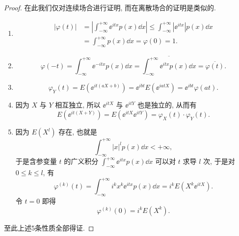 \begin{proof}
    在此我们仅对连续场合进行证明,
    而在离散场合的证明是类似的.
    \begin{enumerate}
        \item
        \begin{align*}
            \lvert \varphi (t) \rvert & = \left\lvert \int_{-\infty}^{+\infty} \ee^{itx} p (x) \dd x \right\rvert
            \leq \int_{-\infty}^{+\infty} \left\lvert \ee^{itx} \right\rvert p (x) \dd x\\
            & = \int_{-\infty}^{+\infty} p (x) \dd x
            = \varphi (0)
            = 1.
        \end{align*}
        \item
        \begin{equation*}
            \varphi (-t) = \int_{-\infty}^{+\infty} \ee^{-itx} p (x) \dd x
            = \overline{\int_{-\infty}^{+\infty} \ee^{itx} p (x) \dd x}
            = \overline{\varphi (t)}.
        \end{equation*}
        \item
        \begin{equation*}
            \varphi_Y (t) = E ( \ee^{it (aX + b)} )
            = \ee^{ibt} E ( \ee^{iatX} ) = \ee^{ibt} \varphi (at).
        \end{equation*}
        \item
        因为 $ X $ 与 $ Y $ 相互独立, 所以 $ \ee^{itX} $ 与 $ \ee^{itY} $ 也是独立的, 从而有
        \begin{equation*}
            E \left( \ee^{it ( X + Y )} \right) = E \left( \ee^{itX} \ee^{itY} \right) = \varphi_X (t) \cdot \varphi_Y (t).
        \end{equation*}
        \item
        因为 $ E \left( X^l \right) $ 存在, 也就是
        \begin{equation*}
            \int_{-\infty}^{+\infty} \lvert x \rvert^l p (x) \dd x < +\infty,
        \end{equation*}
        于是含参变量 $ t $ 的广义积分 $ \int_{-\infty}^{+\infty} \ee^{itx} p(x) \dd x $ 可以对 $ t $ 求导 $ l $ 次, 于是对 $ 0 \leq k \leq l $, 有
        \begin{equation*}
            \varphi ^{(k)} (t) = \int_{-\infty}^{+\infty} i^k x^k \ee^{itx} p (x) \dd x = i^k E \left( X^k \ee^{itX} \right).
        \end{equation*}
        令 $ t = 0 $ 即得
        \begin{equation*}
            \varphi^{(k)} (0) = i^k E \left( X^k \right).
        \end{equation*}
    \end{enumerate}
    至此上述5条性质全部得证.
\end{proof}

